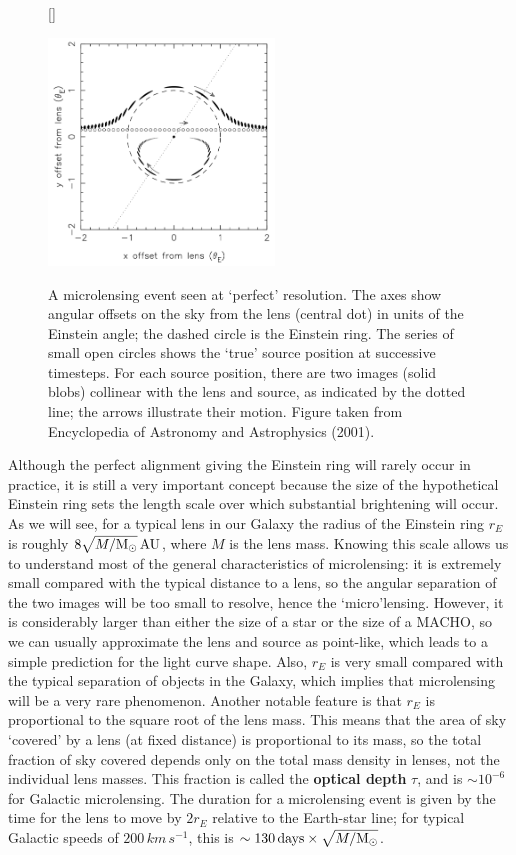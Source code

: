 \documentclass[a4paper,10pt]{article}
\begin{document}
\begin{figure}[t]
    [\FBwidth]
    {\caption{\footnotesize{A microlensing event seen at `perfect' resolution. The axes show angular offsets on the sky from the lens (central dot) in units of the Einstein angle; the dashed circle is the Einstein ring. The series of small open circles shows the `true' source position at successive timesteps. For each source position, there are two images (solid blobs) collinear with the lens and source, as indicated by the dotted line; the arrows illustrate their motion. Figure taken from Encyclopedia of Astronomy and Astrophysics (2001).}}
    \label{fig:microlensing}}
    {\includegraphics[width=6cm]{figures/microlensing.png}}
\end{figure}

{\noindent}Although the perfect alignment giving the Einstein ring will rarely occur in practice, it is still a very important concept because the size of the hypothetical Einstein ring sets the length scale over which substantial brightening will occur. As we will see, for a typical lens in our Galaxy the radius of the Einstein ring $r_E$ is roughly $8\sqrt{M/{\rm M_\odot}}\,{\rm AU}$, where $M$ is the lens mass. Knowing this scale allows us to understand most of the general characteristics of microlensing: it is extremely small compared with the typical distance to a lens, so the angular separation of the two images will be too small to resolve, hence the `micro'lensing. However, it is considerably larger than either the size of a star or the size of a MACHO, so we can usually approximate the lens and source as point-like, which leads to a simple prediction for the light curve shape. Also, $r_E$ is very small compared with the typical separation of objects in the Galaxy, which implies that microlensing will be a very rare phenomenon. Another notable feature is that $r_E$ is proportional to the square root of the lens mass. This means that the area of sky `covered' by a lens (at fixed distance) is proportional to its mass, so the total fraction of sky covered depends only on the total mass density in lenses, not the individual lens masses. This fraction is called the \textbf{optical depth} $\tau$, and is $\sim10^{-6}$ for Galactic microlensing. The duration for a microlensing event is given by the time for the lens to move by $2r_E$ relative to the Earth-star line; for typical Galactic speeds of $200\,{km\,s^{-1}}$, this is $\sim130\,{\rm days}\times\sqrt{M/{\rm M_\odot}}$.
\end{document}
